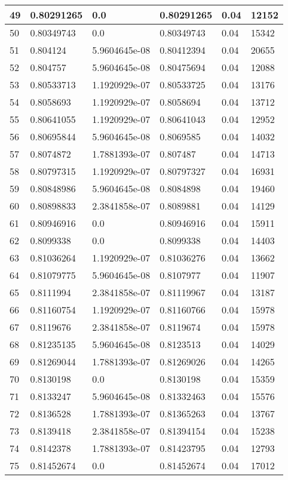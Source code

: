 \begin{longtable}{|l|l|l|l|l|l|}
49 & 0.80291265 & 0.0 & 0.80291265 & 0.04 & 12152 \\ \hline 
50 & 0.80349743 & 0.0 & 0.80349743 & 0.04 & 15342 \\ \hline 
51 & 0.804124 & 5.9604645e-08 & 0.80412394 & 0.04 & 20655 \\ \hline 
52 & 0.804757 & 5.9604645e-08 & 0.80475694 & 0.04 & 12088 \\ \hline 
53 & 0.80533713 & 1.1920929e-07 & 0.80533725 & 0.04 & 13176 \\ \hline 
54 & 0.8058693 & 1.1920929e-07 & 0.8058694 & 0.04 & 13712 \\ \hline 
55 & 0.80641055 & 1.1920929e-07 & 0.80641043 & 0.04 & 12952 \\ \hline 
56 & 0.80695844 & 5.9604645e-08 & 0.8069585 & 0.04 & 14032 \\ \hline 
57 & 0.8074872 & 1.7881393e-07 & 0.807487 & 0.04 & 14713 \\ \hline 
58 & 0.80797315 & 1.1920929e-07 & 0.80797327 & 0.04 & 16931 \\ \hline 
59 & 0.80848986 & 5.9604645e-08 & 0.8084898 & 0.04 & 19460 \\ \hline 
60 & 0.80898833 & 2.3841858e-07 & 0.8089881 & 0.04 & 14129 \\ \hline 
61 & 0.80946916 & 0.0 & 0.80946916 & 0.04 & 15911 \\ \hline 
62 & 0.8099338 & 0.0 & 0.8099338 & 0.04 & 14403 \\ \hline 
63 & 0.81036264 & 1.1920929e-07 & 0.81036276 & 0.04 & 13662 \\ \hline 
64 & 0.81079775 & 5.9604645e-08 & 0.8107977 & 0.04 & 11907 \\ \hline 
65 & 0.8111994 & 2.3841858e-07 & 0.81119967 & 0.04 & 13187 \\ \hline 
66 & 0.81160754 & 1.1920929e-07 & 0.81160766 & 0.04 & 15978 \\ \hline 
67 & 0.8119676 & 2.3841858e-07 & 0.8119674 & 0.04 & 15978 \\ \hline 
68 & 0.81235135 & 5.9604645e-08 & 0.8123513 & 0.04 & 14029 \\ \hline 
69 & 0.81269044 & 1.7881393e-07 & 0.81269026 & 0.04 & 14265 \\ \hline 
70 & 0.8130198 & 0.0 & 0.8130198 & 0.04 & 15359 \\ \hline 
71 & 0.8133247 & 5.9604645e-08 & 0.81332463 & 0.04 & 15576 \\ \hline 
72 & 0.8136528 & 1.7881393e-07 & 0.81365263 & 0.04 & 13767 \\ \hline 
73 & 0.8139418 & 2.3841858e-07 & 0.81394154 & 0.04 & 15238 \\ \hline 
74 & 0.8142378 & 1.7881393e-07 & 0.81423795 & 0.04 & 12793 \\ \hline 
75 & 0.81452674 & 0.0 & 0.81452674 & 0.04 & 17012 \\ \hline 
\end{longtable}